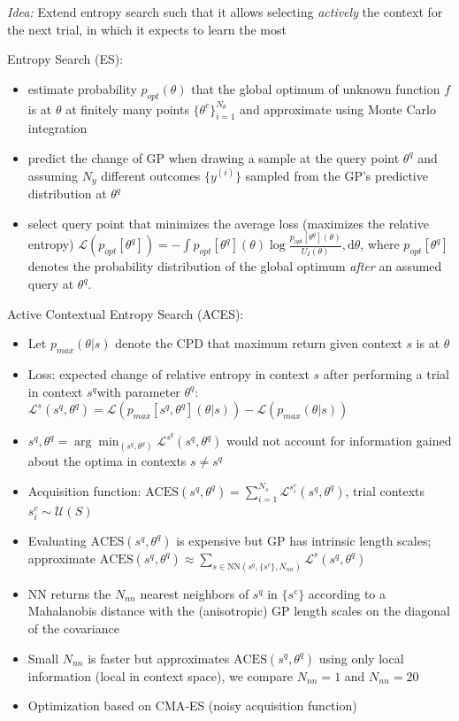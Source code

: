 \begin{block}{}
\emph{Idea:} Extend entropy search such that it allows selecting \emph{actively} the context for the next trial, in which it expects to learn the most

Entropy Search (ES):
\begin{itemize}
 \item estimate probability $p_{opt}(\theta)$ that the global optimum of unknown function $f$ is at $\theta$ at finitely many points $\{\theta^c\}_{i=1}^{N_\theta}$ and approximate using Monte Carlo integration
 \item predict the change of GP when drawing a sample at the query point
$\theta^q$ and assuming $N_y$ different outcomes $\{y^{(i)}\}$ sampled from the
GP's predictive distribution at $\theta^q$
 \item select query point that minimizes the average loss (maximizes the relative entropy) $\mathcal{L}(p_{opt}[\theta^q]) = - \int p_{opt}[\theta^q](\theta) \log \frac{p_{opt}[\theta^q](\theta)}{U_I(\theta)}, \text{d}\theta$,  where $p_{opt}[\theta^q]$ denotes the probability
 distribution of the global optimum \emph{after} an assumed query at $\theta^q$.
\end{itemize}

Active Contextual Entropy Search (ACES):
\begin{itemize}
 \item Let $p_{max}(\theta \vert s)$ denote the CPD that maximum return given context $s$ is at $\theta$
 \item Loss: expected change of relative entropy in context $s$ after performing a trial in context $s^q$with parameter $\theta^q$: $\mathcal{L}^s(s^q, \theta^q) = \mathcal{L}(p_{max}[s^q,\theta^q](\theta \vert s)) - \mathcal{L}(p_{max}(\theta \vert s))$
 \item $s^q, \theta^q = \arg\min_{(s^q, \theta^q)} \mathcal{L}^{s^q}(s^q,
\theta^q)$ would not account for information gained about the
optima in contexts $s \neq s^q$
 \item Acquisition function: $\text{ACES}(s^q, \theta^q) = \sum_{i=1}^{N_s}
\mathcal{L}^{s^c_i}(s^q, \theta^q)$, trial contexts $s^c_i \sim \mathcal{U}(S)$
 \item Evaluating $\text{ACES}(s^q, \theta^q)$ is expensive but GP has intrinsic length scales; \\approximate $\text{ACES}(s^q, \theta^q) \approx \sum_{s \in \text{NN}(s^q,
\{s^c\}, N_{nn})}  \mathcal{L}^s(s^q, \theta^q)$
 \item NN returns the $N_{nn}$ nearest neighbors of  $s^q$ in $\{s^c\}$ according to a Mahalanobis distance with the (anisotropic) GP length scales on the diagonal of the covariance
 \item Small $N_{nn}$ is faster but approximates $\text{ACES}(s^q, \theta^q)$ using only local information (local in context space), we compare $N_{nn}=1$ and $N_{nn}=20$
 \item Optimization based on CMA-ES (noisy acquisition function)
\end{itemize}
\end{block}


